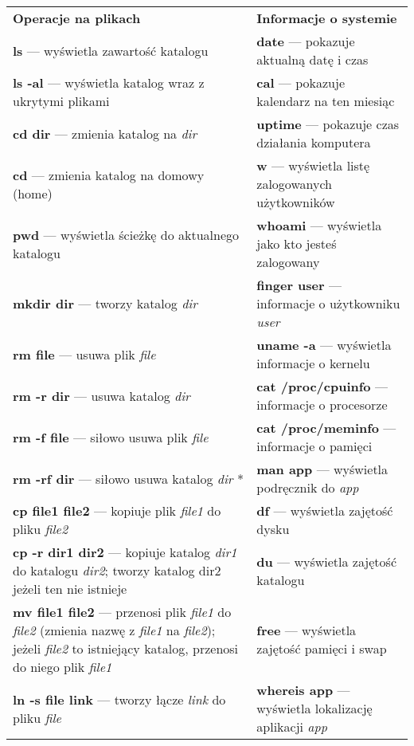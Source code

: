 \label{polecenia}
\tiny
\begin{tabularx}{\linewidth}{p{8.5cm}|p{8.5cm}}
\hline
\cellcolor[gray]{0.90}\textbf{\textcolor{ubuntu_orange}{Operacje na plikach}} & \cellcolor[gray]{0.90}\textbf{\textcolor{ubuntu_orange}{Informacje o systemie}}\\
\textbf{ls} --- wyświetla zawartość katalogu & \textbf{date} --- pokazuje aktualną datę i czas\\
\textbf{ls -al} --- wyświetla katalog wraz z ukrytymi plikami & \textbf{cal} --- pokazuje kalendarz na ten miesiąc\\
\textbf{cd dir} --- zmienia katalog na \textit{dir} & \textbf{uptime} --- pokazuje czas działania komputera\\
\textbf{cd} --- zmienia katalog na domowy (home) & \textbf{w} --- wyświetla listę zalogowanych użytkowników\\
\textbf{pwd} --- wyświetla ścieżkę do aktualnego katalogu & \textbf{whoami} --- wyświetla jako kto jesteś zalogowany\\
\textbf{mkdir dir} --- tworzy katalog \textit{dir} & \textbf{finger user} --- informacje o użytkowniku \textit{user}\\
\textbf{rm file} --- usuwa plik \textit{file} & \textbf{uname -a} --- wyświetla informacje o kernelu\\
\textbf{rm -r dir} --- usuwa katalog \textit{dir} & \textbf{cat /proc/cpuinfo} --- informacje o procesorze\\
\textbf{rm -f file} --- siłowo usuwa plik \textit{file} & \textbf{cat /proc/meminfo} --- informacje o pamięci\\
\textbf{rm -rf dir} --- siłowo usuwa katalog \textit{dir} * & \textbf{man app} --- wyświetla podręcznik do \textit{app}\\
\textbf{cp file1 file2} --- kopiuje plik \textit{file1} do pliku \textit{file2} & \textbf{df} --- wyświetla zajętość dysku\\
\textbf{cp -r dir1 dir2} --- kopiuje katalog \textit{dir1} do katalogu \textit{dir2}; tworzy katalog dir2 jeżeli ten nie istnieje & \textbf{du} --- wyświetla zajętość katalogu\\
\textbf{mv file1 file2} --- przenosi plik \textit{file1} do \textit{file2} (zmienia nazwę z \textit{file1} na \textit{file2}); jeżeli \textit{file2} to istniejący katalog, przenosi do niego plik \textit{file1} & \textbf{free} --- wyświetla zajętość pamięci i swap\\
\textbf{ln -s file link} --- tworzy łącze \textit{link} do pliku \textit{file} & \textbf{whereis app} --- wyświetla lokalizację aplikacji \textit{app}\\

\end{tabularx}
